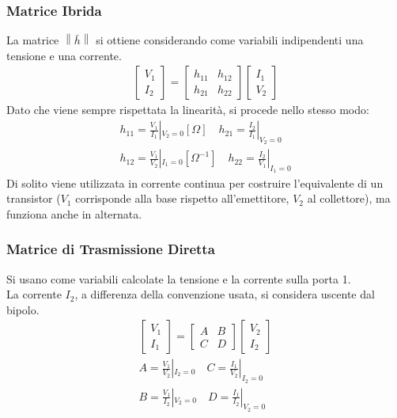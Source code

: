 \documentclass[../main.tex]{subfiles}
\begin{document}
	\subsubsection{Matrice Ibrida}
	La matrice $\left\|\bar h\right\|$ si ottiene considerando come variabili indipendenti una tensione e una corrente.
	\begin{gather} 
		\begin{bmatrix}
			V_1 \\
			I_2
		\end{bmatrix} = \begin{bmatrix}
			h_{11} & h_{12} \\
			h_{21} & h_{22}
		\end{bmatrix} \begin{bmatrix}
			I_1 \\
			V_2
		\end{bmatrix}
	\end{gather} \label{matr-ibrida}
	Dato che viene sempre rispettata la linearità, si procede nello stesso modo:
	\begin{gather}
		h_{11} = \frac{V_1}{I_1}|_{V_2=0} [\Omega] \quad	h_{21} = \frac{I_2}{I_1}|_{V_2=0} \\
		h_{12} = \frac{V_1}{V_2}|_{I_1=0} [\Omega^{-1}] \quad	h_{22} = \frac{I_2}{V_1}|_{I_1=0} 
	\end{gather}
	Di solito viene utilizzata in corrente continua per costruire l'equivalente di un transistor ($V_1$ corrisponde alla base rispetto all'emettitore, $V_2$ al collettore), ma funziona anche in alternata.
	\subsubsection{Matrice di Trasmissione Diretta}
	Si usano come variabili calcolate la tensione e la corrente sulla porta 1.\\
	La corrente $I_2$, a differenza della convenzione usata, si considera uscente dal bipolo.
	\begin{gather}
		\begin{bmatrix}
			V_1 \\
			I_1
		\end{bmatrix} = \begin{bmatrix}
			A & B \\C & D
		\end{bmatrix} \begin{bmatrix}
			V_2 \\ I_2
		\end{bmatrix} \\
		A = \frac{V_1}{V_2}|_{I_2=0} \quad C=\frac{I_1}{V_2}|_{I_2=0} \\
		B = \frac{V_1}{I_2}|_{V_2=0} \quad D=\frac{I_1}{I_2}|_{V_2=0}
	\end{gather}
\end{document}
